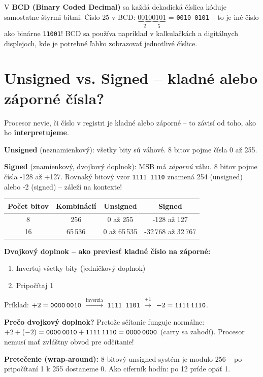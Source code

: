 V \textbf{BCD (Binary Coded Decimal)} sa každá dekadická číslica kóduje samostatne štyrmi bitmi. Číslo 25 v BCD: $\underbrace{0010}_{2}\underbrace{0101}_{5}$ = \texttt{0010\,0101} -- to je iné číslo ako binárne \texttt{11001}! BCD sa používa napríklad v kalkulačkách a digitálnych displejoch, kde je potrebné ľahko zobrazovať jednotlivé číslice.

\section{Unsigned vs. Signed -- kladné alebo záporné čísla?}

Procesor nevie, či číslo v registri je kladné alebo záporné -- to závisí od toho, ako ho \textbf{interpretujeme}.

\textbf{Unsigned} (neznamienkový): všetky bity sú váhové. 8 bitov pojme čísla 0 až 255.

\textbf{Signed} (znamienkový, dvojkový doplnok): MSB má \textit{zápornú} váhu. 8 bitov pojme čísla -128 až +127. Rovnaký bitový vzor \texttt{1111\,1110} znamená 254 (unsigned) alebo -2 (signed) -- záleží na kontexte!

\begin{center}
\begin{tabular}{cccc}
\toprule
\textbf{Počet bitov} & \textbf{Kombinácií} & \textbf{Unsigned} & \textbf{Signed} \\
\midrule
8  & 256     & 0 až 255     & -128 až 127 \\
16 & 65\,536 & 0 až 65\,535 & -32\,768 až 32\,767 \\
\bottomrule
\end{tabular}
\end{center}

\textbf{Dvojkový doplnok -- ako previesť kladné číslo na záporné:}
\begin{enumerate}
    \item Invertuj všetky bity (jedničkový doplnok)
    \item Pripočítaj 1
\end{enumerate}

Príklad: $+2 = \texttt{0000\,0010}$ $\xrightarrow{\text{inverzia}}$ \texttt{1111\,1101} $\xrightarrow{+1}$ $-2 = \texttt{1111\,1110}$.

\textbf{Prečo dvojkový doplnok?} Pretože sčítanie funguje normálne: $+2 + (-2) = \texttt{0000\,0010} + \texttt{1111\,1110} = \texttt{0000\,0000}$ (carry sa zahodí). Procesor nemusí mať zvláštny obvod pre odčítanie!

\textbf{Pretečenie (wrap-around):} 8-bitový unsigned systém je modulo 256 -- po pripočítaní 1 k 255 dostaneme 0. Ako ciferník hodín: po 12 príde opäť 1.

